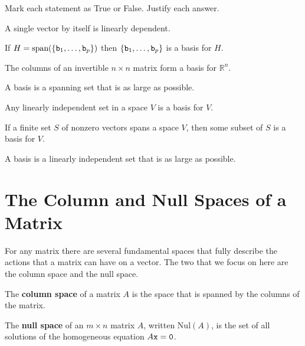 % 
% 
\begin{problem}
    Mark each statement as True or False.  Justify each answer.
\ba
\item A single vector by itself is linearly dependent.
\item If $H = \text{span}(\{\texttt{b}_1, \dots, \texttt{b}_p\})$ then $\{\texttt{b}_1, \dots, \texttt{b}_p\}$ is a
    basis for $H$.
\item The columns of an invertible $n \times n$ matrix form a basis for $\mathbb{R}^n$.
\item A basis is a spanning set that is as large as possible.
\item Any linearly independent set in a space $V$ is a basis for $V$.
\item If a finite set $S$ of nonzero vectors spans a space $V$, then some subset of $S$ is
    a basis for $V$.
\item A basis is a linearly independent set that is as large as possible.
\ea

\end{problem}
% 
\newpage\section{The Column and Null Spaces of a Matrix}
For any matrix there are several fundamental spaces that fully describe the actions that a
matrix can have on a vector.  The two that we focus on here are the column space and the
null space.

\begin{definition}
    The {\bf column space} of a matrix $A$ is the space that is spanned by the columns of the
    matrix.
\end{definition}

\begin{definition}
    The {\bf null space} of an $m \times n$ matrix $A$, written $\text{Nul}(A)$, is the
    set of all solutions of the homogeneous equation $A\texttt{x}=\texttt{0}$.
\end{definition}

